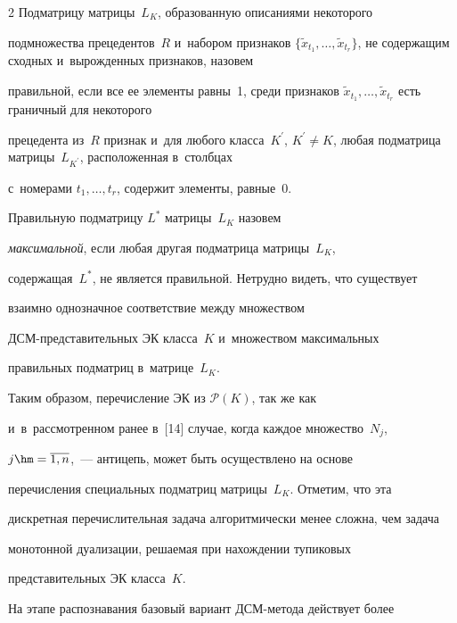 \begin{multicols}{2}
Под\-мат\-ри\-цу мат\-ри\-цы~$L_K$, образованную описаниями некоторого 


подмножества прецедентов~$R$ и~набором признаков $\{ \tilde{x}_{t_1},\ldots , 


\tilde{x}_{t_r}\}$, не содержащим сходных и~вырожденных признаков, назовем 


правильной, если все ее элементы равны~1, среди признаков $ 


\tilde{x}_{t_1},\ldots , \tilde{x}_{t_r}$ есть граничный для некоторого 


прецедента из~$R$ признак и~для любого класса~$K^\prime$, $K^\prime\not= 


K$, любая подматрица матрицы~$L_{K^\prime}$, расположенная в~столбцах 


с~номерами $t_1,\ldots , t_r$, содержит элементы, равные~0. 


  


  Правильную подматрицу $L^*$ матрицы~$L_K$ назовем 


\textit{максимальной}, если любая другая под\-мат\-рица мат\-ри\-цы~$L_K$, 


содержащая~$L^*$, не является правильной. Нетрудно видеть, что существует 


взаимно \mbox{однозначное} соответствие между множеством 


 ДСМ-пред\-ста\-ви\-тель\-ных ЭК класса~$K$ и~множеством максимальных 


правильных под\-мат\-риц в~мат\-ри\-це~$L_K$. 


  


  Таким образом, перечисление ЭК из $\mathcal{P}(K)$, так же как 


и~в~рассмотренном ранее в~[14] случае, когда каждое множество~$N_j$, 


$j\hm= \overline{1, n}$,~--- антицепь, может быть осуществлено на основе 


перечисления специальных подматриц матрицы~$L_K$. Отметим, что эта 


дискретная перечислительная задача алгоритмически менее сложна, чем задача 


монотонной дуализации, решаемая при нахождении тупиковых 


представительных ЭК класса~$K$. 


  


  На этапе распознавания базовый вариант ДСМ-ме\-то\-да действует более 



\end{multicols}
